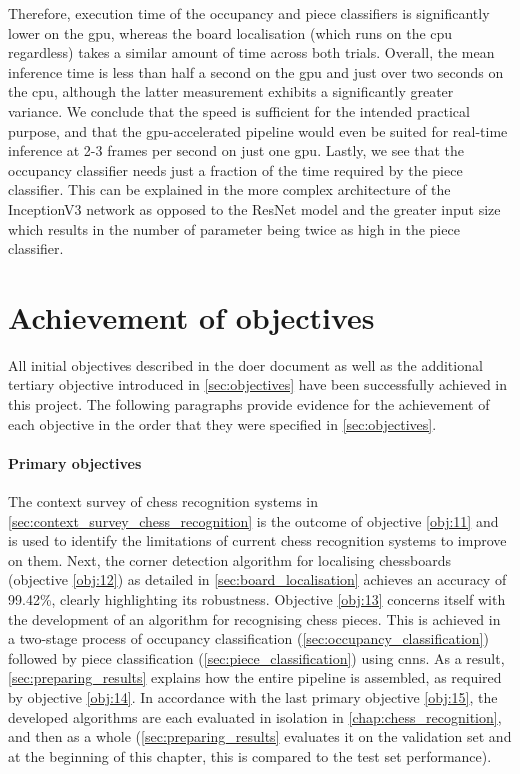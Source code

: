 \documentclass[../main.tex]{subfiles}
\begin{document}
Therefore, execution time of the occupancy and piece classifiers is significantly lower on the \gls{gpu}, whereas the board localisation (which runs on the \gls{cpu} regardless) takes a similar amount of time across both trials. 
Overall, the mean inference time is less than half a second on the \gls{gpu} and just over two seconds on the \gls{cpu}, although the latter measurement exhibits a significantly greater variance.
We conclude that the speed is sufficient for the intended practical purpose, and that the \gls{gpu}-accelerated pipeline would even be suited for real-time inference at 2-3 frames per second on just one \gls{gpu}.
Lastly, we see that the occupancy classifier needs just a fraction of the time required by the piece classifier.
This can be explained in the more complex architecture of the InceptionV3 network as opposed to the ResNet model and the greater input size which results in the number of parameter being twice as high in the piece classifier.

\section{Achievement of objectives}
\label{sec:achievement_of_objectives}
All initial objectives described in the \gls{doer} document as well as the additional tertiary objective introduced in \cref{sec:objectives} have been successfully achieved in this project.
The following paragraphs provide evidence for the achievement of each objective in the order that they were specified in \cref{sec:objectives}.

\paragraph{Primary objectives}
The context survey of chess recognition systems in \cref{sec:context_survey_chess_recognition} is the outcome of objective \ref{obj:11} and is used to identify the limitations of current chess recognition systems to improve on them.
Next, the corner detection algorithm for localising chessboards (objective \ref{obj:12}) as detailed in \cref{sec:board_localisation} achieves an accuracy of 99.42\%, clearly highlighting its robustness.
Objective \ref{obj:13} concerns itself with the development of an algorithm for recognising chess pieces.
This is achieved in a two-stage process of occupancy classification (\cref{sec:occupancy_classification}) followed by piece classification (\cref{sec:piece_classification}) using \glspl{cnn}.
As a result, \cref{sec:preparing_results} explains how the entire pipeline is assembled, as required by objective \ref{obj:14}.
In accordance with the last primary objective \ref{obj:15}, the developed algorithms are each evaluated in isolation in \cref{chap:chess_recognition}, and then as a whole (\cref{sec:preparing_results} evaluates it on the validation set and at the beginning of this chapter, this is compared to the test set performance).
\end{document}
